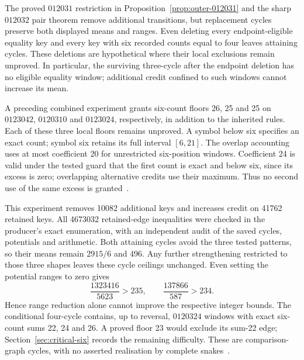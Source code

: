 \documentclass[11pt,a4paper]{article}
\theoremstyle{definition}
\theoremstyle{remark}
\begin{document}
The proved $012031$ restriction in Proposition~\ref{prop:outer-012031} and
the sharp $012032$ pair theorem remove additional transitions, but
replacement cycles preserve both displayed means and ranges. Even deleting
every endpoint-eligible equality key and every key with six recorded counts
equal to four leaves attaining cycles. These deletions are hypothetical
where their local exclusions remain unproved. In particular, the surviving
three-cycle after the endpoint deletion has no eligible equality window;
additional credit confined to such windows cannot increase its mean.

A preceding combined experiment grants six-count floors 26, 25 and 25 on
$0123042$, $0120310$ and $0123024$, respectively, in addition to the inherited
rules. Each of these three local floors remains unproved. A symbol below
six specifies an exact count; symbol six retains its full interval
$[6,21]$. The overlap accounting uses at most coefficient 20 for unrestricted
six-position windows. Coefficient 24 is valid under the tested guard that
the first count is exact and below six, since its excess is zero; overlapping
alternative credits use their maximum. Thus no second use of the same
excess is granted~\cite{latersumarchive,uniformsixarchive}.

This experiment removes 10082 additional keys and increases credit on
41762 retained keys. All 4673032 retained-edge inequalities were checked in
the producer's exact enumeration, with an independent audit of the saved
cycles, potentials and arithmetic. Both attaining cycles avoid the three
tested patterns, so their means remain $2915/6$ and 496. Any further
strengthening restricted to those three shapes leaves these cycle ceilings
unchanged. Even setting the potential ranges to zero gives
\[
\frac{1323416}{5623}>235,\qquad
\frac{137866}{587}>234.
\]
Hence range reduction alone cannot improve the respective integer bounds.
The conditional four-cycle contains, up to reversal, $0120324$ windows with
exact six-count sums 22, 24 and 26. A proved floor 23 would exclude its
sum-22 edge; Section~\ref{sec:critical-six} records the remaining difficulty.
These are comparison-graph cycles, with no asserted realisation by complete
snakes~\cite{uniformsixarchive,criticalsixarchive}.
\end{document}
